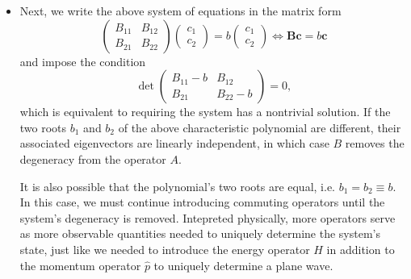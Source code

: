 \documentclass[11pt, a4paper]{article}
\renewcommand{\vec}[1]{\bm{#1}}  %
\newcommand{\mat}[1]{\mathbf{#1}}  %
\begin{document}
\begin{itemize}
    \item Next, we write the above system of equations in the matrix form
    \begin{equation*}
        \begin{pmatrix}
            B_{11} & B_{12}\\
            B_{21} & B_{22}
        \end{pmatrix}
        \begin{pmatrix}
            c_{1}\\
            c_{2}
        \end{pmatrix}
        = b
        \begin{pmatrix}
            c_{1}\\
            c_{2}
        \end{pmatrix} \iff \mat{B} \vec{c} = b \vec{c}
    \end{equation*}
    and impose the condition
    \begin{equation*}
        \det 
        \begin{pmatrix}
            B_{11} - b & B_{12}\\
            B_{21} & B_{22} - b
        \end{pmatrix} 
        = 0,
    \end{equation*}
    which is equivalent to requiring the system has a nontrivial solution. If the two roots $ b_{1} $ and $ b_{2} $ of the above characteristic polynomial are different, their associated eigenvectors are linearly independent, in which case $ B $ removes the degeneracy from the operator $ A $.

    It is also possible that the polynomial's two roots are equal, i.e. $ b_{1} = b_{2} \equiv b $. In this case, we must continue introducing commuting operators until the system's degeneracy is removed. Intepreted physically, more operators serve as more observable quantities needed to uniquely determine the system's state, just like we needed to introduce the energy operator $ H $ in addition to the momentum operator $ \hat{p} $ to uniquely determine a plane wave.
    
\end{itemize}
\end{document}
